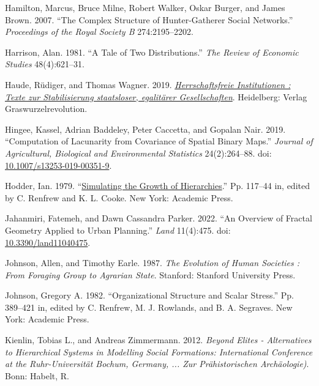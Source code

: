 \documentclass[
  12pt,
]{book}
\newlength{\cslhangindent}
\newlength{\cslentryspacingunit} %
\newenvironment{CSLReferences}[2] %
 {%
  \setlength{\parindent}{0pt}
  \ifodd #1
  \let\oldpar\par
  \def\par{\hangindent=\cslhangindent\oldpar}
  \fi
  \setlength{\parskip}{#2\cslentryspacingunit}
 }%
 {}
\begin{document}
\begin{CSLReferences}{1}{0}
\leavevmode{}%
Hamilton, Marcus, Bruce Milne, Robert Walker, Oskar Burger, and James Brown. 2007. {``The Complex Structure of Hunter-Gatherer Social Networks.''} \emph{Proceedings of the Royal Society B} 274:2195--2202.

\leavevmode{}%
Harrison, Alan. 1981. {``A Tale of Two Distributions.''} \emph{The Review of Economic Studies} 48(4):621--31.

\leavevmode{}%
Haude, Rüdiger, and Thomas Wagner. 2019. \emph{\href{http://www.deutsche-digitale-bibliothek.de/item/7WYRGHTXGAOZOF5JUQ5JQCONFJKLTBIE}{Herrschaftsfreie Institutionen : Texte zur Stabilisierung staatsloser, egalitärer Gesellschaften}}. Heidelberg: Verlag Graswurzelrevolution.

\leavevmode{}%
Hingee, Kassel, Adrian Baddeley, Peter Caccetta, and Gopalan Nair. 2019. {``Computation of Lacunarity from Covariance of Spatial Binary Maps.''} \emph{Journal of Agricultural, Biological and Environmental Statistics} 24(2):264--88. doi: \href{https://doi.org/10.1007/s13253-019-00351-9}{10.1007/s13253-019-00351-9}.

\leavevmode{}%
Hodder, Ian. 1979. {``\href{https://doi.org/10.1016/B978-0-12-586050-5.50015-4}{Simulating the Growth of Hierarchies}.''} Pp. 117--44 in, edited by C. Renfrew and K. L. Cooke. New York: Academic Press.

\leavevmode{}%
Jahanmiri, Fatemeh, and Dawn Cassandra Parker. 2022. {``An Overview of Fractal Geometry Applied to Urban Planning.''} \emph{Land} 11(4):475. doi: \href{https://doi.org/10.3390/land11040475}{10.3390/land11040475}.

\leavevmode{}%
Johnson, Allen, and Timothy Earle. 1987. \emph{The Evolution of Human Societies : From Foraging Group to Agrarian State}. Stanford: Stanford University Press.

\leavevmode{}%
Johnson, Gregory A. 1982. {``Organizational Structure and Scalar Stress.''} Pp. 389--421 in, edited by C. Renfrew, M. J. Rowlands, and B. A. Segraves. New York: Academic Press.

\leavevmode{}%
Kienlin, Tobias L., and Andreas Zimmermann. 2012. \emph{Beyond Elites - Alternatives to Hierarchical Systems in Modelling Social Formations: International Conference at the Ruhr-Universität Bochum, Germany, ... Zur Prähistorischen Archäologie)}. Bonn: Habelt, R.


\end{CSLReferences}
\end{document}
